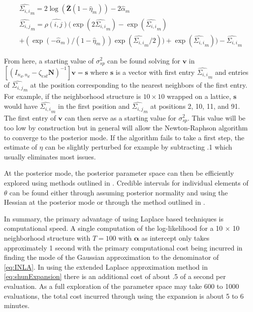 \documentclass[11pt]{isuthesis}
\begin{document}
	\begin{align}
		& \widehat{\Sigma_{i,i}}_m = 2\log(\bar{\boldsymbol{Z}}(1-\widehat{\eta}_m))-2\widehat{\alpha}_m\\
		& \widehat{\Sigma_{i,j}}_m = \widehat{\rho(i,j)}(\exp(2\widehat{\Sigma_{i,i}}_m)-\exp(\widehat{\Sigma_{i,i}}_m)\nonumber \\
		&+(\exp(-\widehat{\alpha}_m)/(1-\widehat{\eta}_m))\exp(\widehat{\Sigma_{i,i}}_m/2))+\exp(\widehat{\Sigma_{i,i}}_m))-\widehat{\Sigma_{i,i}}_m \label{eq:sigmamom}
	\end{align}

	From here, a starting value of $\sigma^2_{sp}$ can be found solving for $\boldsymbol{v}$ in $\left[(I_{{n_d},{n_d}}-\zeta_{est}\boldsymbol{N})^{-1}\right]\boldsymbol{v}=\boldsymbol{s}$ where $\boldsymbol{s}$ is a vector with first entry $\widehat{\Sigma_{i,i}}_m$ and entries of $\widehat{\Sigma_{i,j}}_m$ at the position corresponding to the nearest neighbors of the first entry.  For example, if the neighborhood structure is $10 \times 10$ wrapped on a lattice, $\boldsymbol{s}$ would have $\widehat{\Sigma_{i,i}}_m$ in the first position and $\widehat{\Sigma_{i,j}}_m$ at positions 2, 10, 11, and 91.  The first entry of $\boldsymbol{v}$ can then serve as a starting value for $\sigma^2_{sp}$. This value will be too low by construction but in general will allow the Newton-Raphson algorithm to converge to the posterior mode.  If the algorithm fails to take a first step, the estimate of $\eta$ can be slightly perturbed for example by subtracting .1 which usually eliminates most issues.
	
	At the posterior mode, the posterior parameter space can then be efficiently explored using methods outlined in \cite{rue2009approximate}.  Credible intervals for individual elements of $\theta$ can be found either through assuming posterior normality and using the Hessian at the posterior mode or through the method outlined in \cite{ferkingstad2015improving}.  
	
	In summary, the primary advantage of using Laplace based techniques is computational speed.  A single computation of the log-likelihood for a 10 $\times$ 10 neighborhood structure with $T=100$ with $\boldsymbol{\alpha}$ as intercept only takes approximately 1 second with the primary computational cost being incurred in finding the mode of the Gaussian approximation to the denominator of \eqref{eq:INLA}.  In using the extended Laplace approximation method in \eqref{eq:shunExpansion} there is an additional cost of about .5 of a second per evaluation.  As a full exploration of the parameter space may take 600 to 1000 evaluations, the total cost incurred through using the expansion is about 5 to 6 minutes.
\end{document}

